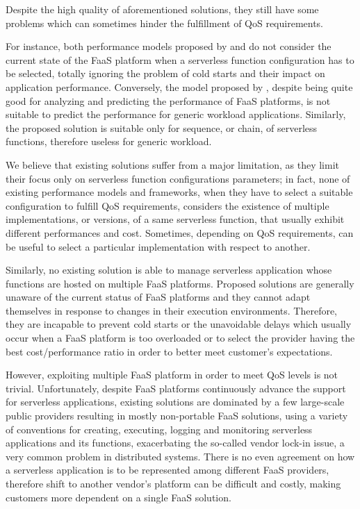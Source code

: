 \documentclass[12pt,a4paper]{report}
\begin{document}
Despite the high quality of aforementioned solutions, they still have some problems which can sometimes hinder the fulfillment of QoS requirements. 

For instance, both performance models proposed by \citet{COSE} and \citet{PMSCP} do not consider the current state of the FaaS platform when a serverless function configuration has to be selected, totally ignoring the problem of cold starts and their impact on application performance. Conversely, the model proposed by \citet{Modelling}, despite being quite good for analyzing and predicting the performance of FaaS platforms, is not suitable to predict the performance for generic workload applications. Similarly, the \citet{COSE} proposed solution is suitable only for sequence, or chain, of serverless functions, therefore useless for generic workload. 

We believe that existing solutions suffer from a major limitation, as they limit their focus only on serverless function configurations parameters; in fact, none of existing performance models and frameworks, when they have to select a suitable configuration to fulfill QoS requirements, considers the existence of multiple implementations, or versions, of a same serverless function, that usually exhibit different performances and cost. Sometimes, depending on QoS requirements, can be useful to select a particular implementation with respect to another. 

Similarly, no existing solution is able to manage serverless application whose functions are hosted on multiple FaaS platforms. Proposed solutions are generally unaware of the current status of FaaS platforms and they cannot adapt themselves in response to changes in their execution environments. Therefore, they are incapable to prevent cold starts or the unavoidable delays which usually occur when a FaaS platform is too overloaded or to select the provider having the best cost/performance ratio in order to better meet customer's expectations.

However, exploiting multiple FaaS platform in order to meet QoS levels is not trivial. Unfortunately, despite FaaS platforms continuously advance the support for serverless applications, existing solutions are dominated by a few large-scale public providers resulting in mostly non-portable FaaS solutions, using a variety of conventions for creating, executing, logging and monitoring serverless applications and its functions, exacerbating the so-called vendor lock-in issue, a very common problem in distributed systems. There is no even agreement on how a serverless application is to be represented among different FaaS providers, therefore shift to another vendor's platform can be difficult and costly, making customers more dependent on a single FaaS solution.
\end{document}
